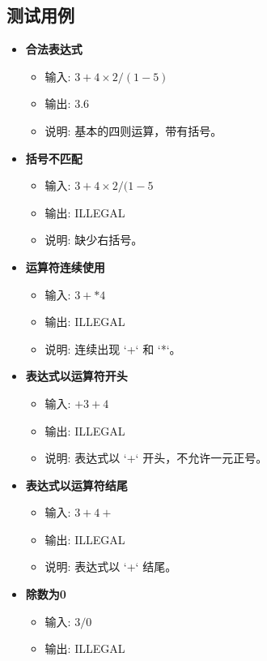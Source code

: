 \documentclass{article}
\begin{document}
\subsection{测试用例}
\begin{itemize}
    \item \textbf{合法表达式}
    \begin{itemize}
        \item 输入: \(3 + 4 \times 2 / ( 1 - 5 )\)
        \item 输出: \(3.6\)
        \item 说明: 基本的四则运算，带有括号。
    \end{itemize}
    \item \textbf{括号不匹配}
    \begin{itemize}
        \item 输入: \(3 + 4 \times 2 / ( 1 - 5\)
        \item 输出: ILLEGAL
        \item 说明: 缺少右括号。
    \end{itemize}
    \item \textbf{运算符连续使用}
    \begin{itemize}
        \item 输入: \(3 + * 4\)
        \item 输出: ILLEGAL
        \item 说明: 连续出现 `+` 和 `*`。
    \end{itemize}
    \item \textbf{表达式以运算符开头}
    \begin{itemize}
        \item 输入: \(+ 3 + 4\)
        \item 输出: ILLEGAL
        \item 说明: 表达式以 `+` 开头，不允许一元正号。
    \end{itemize}
    \item \textbf{表达式以运算符结尾}
    \begin{itemize}
        \item 输入: \(3 + 4 +\)
        \item 输出: ILLEGAL
        \item 说明: 表达式以 `+` 结尾。
    \end{itemize}
    \item \textbf{除数为0}
    \begin{itemize}
        \item 输入: \(3 / 0\)
        \item 输出: ILLEGAL

\end{itemize}
\end{itemize}
\end{document}
